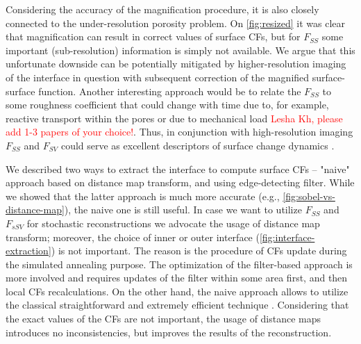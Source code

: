 \documentclass[reprint,amsmath,amssymb,aps,pre,showkeys,showpacs]{revtex4-1}
\begin{document}
Considering the accuracy of the magnification procedure, it is also closely
connected to the under-resolution porosity problem. On \cref{fig:resized}
it was clear that magnification can result in correct values of surface CFs, but
for $F_{SS}$ some important (sub-resolution) information is simply not
available. We argue that this unfortunate downside can be potentially mitigated
by higher-resolution imaging of the interface in question with subsequent
correction of the magnified surface-surface function. Another interesting
approach would be to relate the $F_{SS}$ to some roughness coefficient that
could change with time due to, for example, reactive transport within the pores
\cite{godinho2016,noiriel2021,prokhorov2022} or due to mechanical load %
\textcolor{red}{Lesha Kh, please add 1-3 papers of your choice!}. Thus, in
conjunction with high-resolution imaging $F_{SS}$ and $F_{SV}$ could serve as
excellent descriptors of surface change dynamics \cite{chen2022}.

We described two ways to extract the interface to compute surface CFs -- "naive"
approach based on distance map transform, and using edge-detecting filter. While
we showed that the latter approach is much more accurate (e.g.,
\cref{fig:sobel-vs-distance-map}), the naive one is still useful. In case we
want to utilize $F_{SS}$ and $F_{sSV}$ for stochastic reconstructions
\cite{Y-T,JiaoPNAS,karsaninaPRL} we advocate the usage of distance map
transform; moreover, the choice of inner or outer interface
(\cref{fig:interface-extraction}) is not important. The reason is the procedure
of CFs update during the simulated annealing purpose. The optimization of the
filter-based approach is more involved and requires updates of the filter within
some area first, and then local CFs recalculations. On the other hand, the naive
approach allows to utilize the classical straightforward and extremely efficient
technique \cite{rozman2001}. Considering that the exact values of the CFs are
not important, the usage of distance maps introduces no inconsistencies, but
improves the results of the reconstruction.
\end{document}
